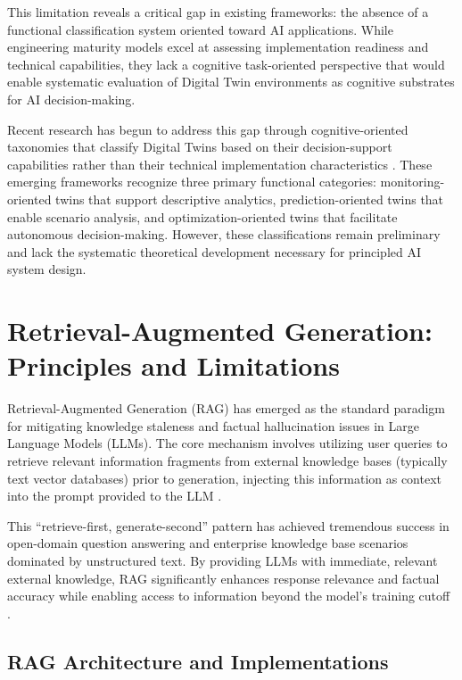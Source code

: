 This limitation reveals a critical gap in existing frameworks: the absence of a functional classification system oriented toward AI applications. While engineering maturity models excel at assessing implementation readiness and technical capabilities, they lack a cognitive task-oriented perspective that would enable systematic evaluation of Digital Twin environments as cognitive substrates for AI decision-making.

Recent research has begun to address this gap through cognitive-oriented taxonomies that classify Digital Twins based on their decision-support capabilities rather than their technical implementation characteristics \cite{jones2020cognitive, negri2017review}. These emerging frameworks recognize three primary functional categories: monitoring-oriented twins that support descriptive analytics, prediction-oriented twins that enable scenario analysis, and optimization-oriented twins that facilitate autonomous decision-making. However, these classifications remain preliminary and lack the systematic theoretical development necessary for principled AI system design.

\section{Retrieval-Augmented Generation: Principles and Limitations}

Retrieval-Augmented Generation (RAG) has emerged as the standard paradigm for mitigating knowledge staleness and factual hallucination issues in Large Language Models (LLMs). The core mechanism involves utilizing user queries to retrieve relevant information fragments from external knowledge bases (typically text vector databases) prior to generation, injecting this information as context into the prompt provided to the LLM \cite{lewis2020retrieval, karpukhin2020dense}.

This ``retrieve-first, generate-second'' pattern has achieved tremendous success in open-domain question answering and enterprise knowledge base scenarios dominated by unstructured text. By providing LLMs with immediate, relevant external knowledge, RAG significantly enhances response relevance and factual accuracy while enabling access to information beyond the model's training cutoff \cite{guu2020retrieval}.

\subsection{RAG Architecture and Implementations}

